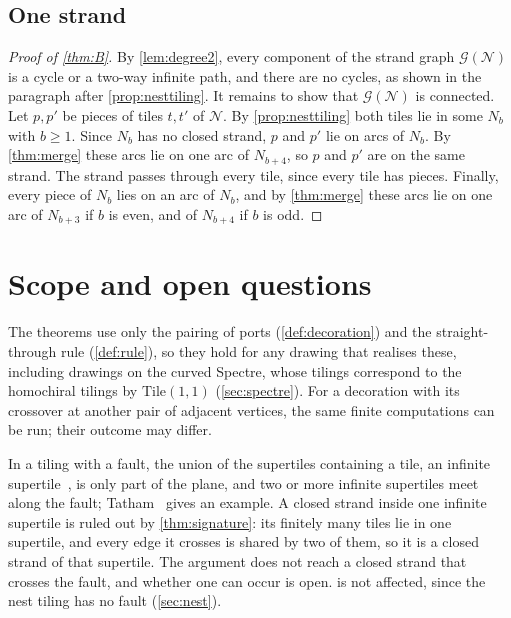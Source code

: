 \documentclass[11pt]{amsart}
\theoremstyle{definition}
\theoremstyle{remark}
\newcommand{\Tile}{\mathrm{Tile}(1,1)}
\newcommand{\G}{\mathcal G}
\newcommand{\N}{\mathcal N}
\begin{document}
\subsection{One strand}\label{sec:onestrand}
\begin{proof}[Proof of \cref{thm:B}]
By \cref{lem:degree2}, every component of the strand graph $\G(\N)$ is a cycle or a two-way infinite path, and there
are no cycles, as shown in the paragraph after \cref{prop:nesttiling}. It remains to show that $\G(\N)$ is connected.
Let $p,p'$ be pieces of tiles $t,t'$ of $\N$. By \cref{prop:nesttiling} both tiles lie in some $N_b$ with $b\ge1$. Since
$N_b$ has no closed strand, $p$ and $p'$ lie on arcs of $N_b$. By \cref{thm:merge} these arcs lie on one arc of
$N_{b+4}$, so $p$ and $p'$ are on the same strand. The strand passes through every tile, since every tile has pieces.
Finally, every piece of $N_b$ lies on an arc of $N_b$, and by \cref{thm:merge} these arcs lie on one arc of $N_{b+3}$
if $b$ is even, and of $N_{b+4}$ if $b$ is odd.
\end{proof}

\section{Scope and open questions}\label{sec:scope}

The theorems use only the pairing of ports (\cref{def:decoration}) and the straight-through rule (\cref{def:rule}), so
they hold for any drawing that realises these, including drawings on the curved Spectre, whose tilings correspond to the
homochiral tilings by $\Tile$ (\cref{sec:spectre}). For a decoration with its crossover at another pair of adjacent
vertices, the same finite computations can be run; their outcome may differ.

In a tiling with a fault, the union of the supertiles containing a tile, an infinite
supertile~\cite[\S5]{TathamTransducers}, is only part of the plane, and two or more infinite supertiles meet along the
fault; Tatham~\cite[\S7.3]{TathamTransducers} gives an example. A closed strand inside one infinite supertile is ruled
out by \cref{thm:signature}: its finitely many tiles lie in one supertile, and every edge it crosses is shared by two of
them, so it is a closed strand of that supertile. The argument does not reach a closed strand that crosses the fault,
and whether one can occur is open.  is not affected, since the nest tiling has no fault (\cref{sec:nest}).
\end{document}
